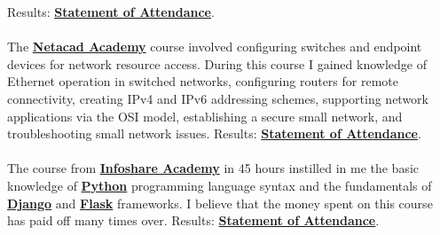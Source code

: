 \documentclass[theme]{cv_einstein}
\begin{document}
\begin{paracol}{2}
\begin{rightcolumn}
            {Results: \href{https://drive.google.com/file/d/1Q6IBp6MqAddaCwaZqZxMo0kMkV-l9WKb/view}{\textbf{Statement of Attendance}}.}\\
            \vspace{\itemspace}\\
            {The \href{https://www.netacad.com/}{\textbf{Netacad Academy}} course involved configuring switches and endpoint devices for network resource access. During this course I gained knowledge of Ethernet operation in switched networks, configuring routers for remote connectivity, creating IPv4 and IPv6 addressing schemes, supporting network applications via the OSI model, establishing a secure small network, and troubleshooting small network issues.}
            {Results: \href{https://drive.google.com/file/d/1vHRxM6J5HI5tNsH_mfFKZNjf9m25LXc9/view}{\textbf{Statement of Attendance}}.}\\
            \vspace{\itemspace}\\
            {The course from \href{https://infoshareacademy.com/}{\textbf{Infoshare Academy}} in 45 hours instilled in me the basic knowledge of \href{https://www.python.org/}{\textbf{Python}} programming language syntax and the fundamentals of \href{https://www.djangoproject.com/}{\textbf{Django}} and \href{https://flask.palletsprojects.com/}{\textbf{Flask}} frameworks. I believe that the money spent on this course has paid off many times over.}
            {Results: \href{https://drive.google.com/file/d/10PP3qx6BOw9ZF7lJsH-YOfFBLjtf5vl8/view}{\textbf{Statement of Attendance}}.}\\
            \vspace{\itemspace}\\

\end{rightcolumn}
\end{paracol}
\end{document}
